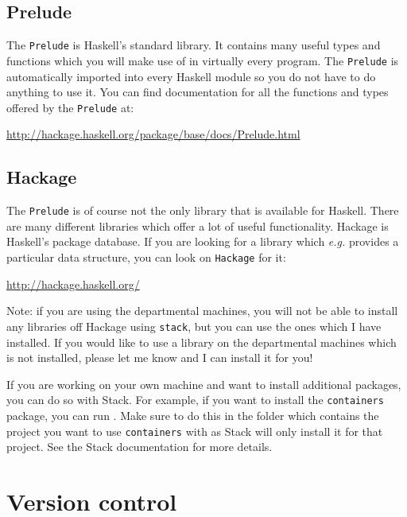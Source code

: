 \subsection{Prelude} 

The \texttt{\small Prelude} is Haskell's standard library. It contains many useful types and functions which you will make use of in virtually every program. The \texttt{\small Prelude} is automatically imported into every Haskell module so you do not have to do anything to use it. You can find documentation for all the functions and types offered by the \texttt{\small Prelude} at:
\begin{center}
\url{http://hackage.haskell.org/package/base/docs/Prelude.html}
\end{center}

\subsection{Hackage} 
\label{sec:hackage}

The \texttt{\small Prelude} is of course not the only library that is available for Haskell. There are many different libraries which offer a lot of useful functionality. Hackage is Haskell's package database. If you are looking for a library which \emph{e.g.} provides a particular data structure, you can look on \texttt{\small Hackage} for it:
\begin{center}
\url{http://hackage.haskell.org/}
\end{center}
Note: if you are using the departmental machines, you will not be able to install any libraries off Hackage using \texttt{\small stack}, but you can use the ones which I have installed. If you would like to use a library on the departmental machines which is not installed, please let me know and I can install it for you!

If you are working on your own machine and want to install additional packages, you can do so with Stack. For example, if you want to install the \texttt{\small containers} package, you can run . Make sure to do this in the folder which contains the project you want to use \texttt{\small containers} with as Stack will only install it for that project. See the Stack documentation for more details.

\section{Version control}
\label{sec:git}

